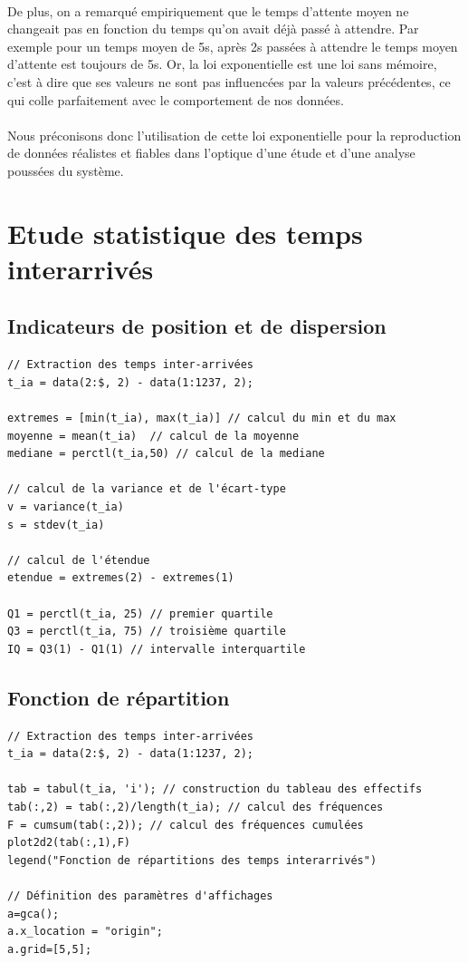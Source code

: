 \documentclass{article}
\begin{document}
\paragraph{}     
De plus, on a remarqué empiriquement que le temps d'attente moyen ne changeait pas en fonction du temps qu'on avait déjà passé à  attendre. Par exemple pour un temps moyen de 5s, après 2s passées à attendre le temps moyen d'attente est toujours de 5s. Or, la loi exponentielle est une loi sans mémoire, c'est à dire que ses valeurs ne sont pas influencées par la valeurs précédentes, ce qui colle parfaitement avec le comportement de nos données.
\paragraph{}
Nous préconisons donc l’utilisation de cette loi exponentielle pour la reproduction de données réalistes et fiables dans l’optique d’une étude et d’une analyse poussées du système.

\newpage
\appendix

\section{Etude statistique des temps interarrivés}

\subsection{Indicateurs de position et de dispersion}
\begin{verbatim}
// Extraction des temps inter-arrivées
t_ia = data(2:$, 2) - data(1:1237, 2);

extremes = [min(t_ia), max(t_ia)] // calcul du min et du max
moyenne = mean(t_ia)  // calcul de la moyenne
mediane = perctl(t_ia,50) // calcul de la mediane

// calcul de la variance et de l'écart-type
v = variance(t_ia)
s = stdev(t_ia)

// calcul de l'étendue
etendue = extremes(2) - extremes(1)

Q1 = perctl(t_ia, 25) // premier quartile
Q3 = perctl(t_ia, 75) // troisième quartile
IQ = Q3(1) - Q1(1) // intervalle interquartile
\end{verbatim}

\subsection{Fonction de répartition}
\begin{verbatim}
// Extraction des temps inter-arrivées
t_ia = data(2:$, 2) - data(1:1237, 2);

tab = tabul(t_ia, 'i'); // construction du tableau des effectifs
tab(:,2) = tab(:,2)/length(t_ia); // calcul des fréquences
F = cumsum(tab(:,2)); // calcul des fréquences cumulées
plot2d2(tab(:,1),F)
legend("Fonction de répartitions des temps interarrivés")

// Définition des paramètres d'affichages
a=gca();
a.x_location = "origin";
a.grid=[5,5];

\end{verbatim}
\end{document}
